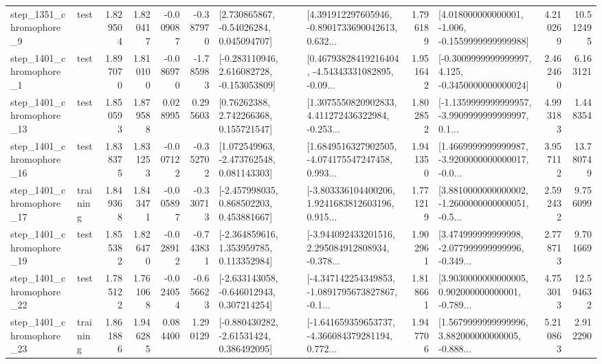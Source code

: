\begin{tabular}{llrrrrllrlrr}
  step\_1351\_chromophore\_9 &      test &      1.829504 &    1.820417 &     -0.009087 & -0.387970 &     [2.730865867, -0.54026284, 0.045094707] &  [4.391912297605946, -0.8901733690042613, 0.632... &       1.796189 &   [4.018000000000001, -1.006, -0.1559999999999988] &            4.210269 &         10.512495 \\
  step\_1401\_chromophore\_1 &      test &      1.897070 &    1.810100 &     -0.086970 & -1.785983 &   [-0.283110946, 2.616082728, -0.153053809] &  [0.46793828419216404, -4.54343331082895, -0.09... &       1.951642 &  [-0.3009999999999997, 4.125, -0.3450000000000024] &            2.462460 &          6.163121 \\
 step\_1401\_chromophore\_13 &      test &      1.850593 &    1.879588 &      0.028995 &  0.295603 &      [0.76262388, 2.742266368, 0.155721547] &  [1.3075550820902833, 4.411272436322984, -0.253... &       1.802852 &  [-1.1359999999999957, -3.9909999999999997, 0.1... &            4.993183 &          1.448354 \\
 step\_1401\_chromophore\_16 &      test &      1.838375 &    1.831253 &     -0.007122 & -0.352702 &    [1.072549963, -2.473762548, 0.081143303] &  [1.6849516327902505, -4.074175547247458, 0.993... &       1.941350 &  [1.4669999999999987, -3.9200000000000017, -0.0... &            3.957112 &         13.780749 \\
 step\_1401\_chromophore\_17 &  training &      1.849368 &    1.843471 &     -0.005897 & -0.330713 &    [-2.457998035, 0.868502203, 0.453881667] &  [-3.803336104400206, 1.9241683812603196, 0.915... &       1.771219 &  [3.8810000000000002, -1.2600000000000051, -0.5... &            2.592432 &          9.756099 \\
 step\_1401\_chromophore\_19 &      test &      1.855382 &    1.826470 &     -0.028912 & -0.743831 &    [-2.364859616, 1.353959785, 0.113352984] &  [-3.944092433201516, 2.295084912808934, -0.378... &       1.902961 &  [3.474999999999998, -2.077999999999996, -0.349... &            2.778713 &          9.701669 \\
 step\_1401\_chromophore\_22 &      test &      1.785122 &    1.761068 &     -0.024054 & -0.656623 &   [-2.633143058, -0.646012943, 0.307214254] &  [-4.347142254349853, -1.0891795673827867, -0.1... &       1.818661 &  [3.9030000000000005, 0.902000000000001, -0.789... &            4.753013 &         12.594632 \\
 step\_1401\_chromophore\_23 &  training &      1.861886 &    1.946285 &      0.084400 &  1.290129 &    [-0.880430282, -2.61531424, 0.386492095] &  [-1.641659359653737, -4.366084379281194, 0.772... &       1.947706 &  [1.5679999999999996, 3.882000000000005, -0.888... &            5.210863 &          2.912290 \\

\end{tabular}
